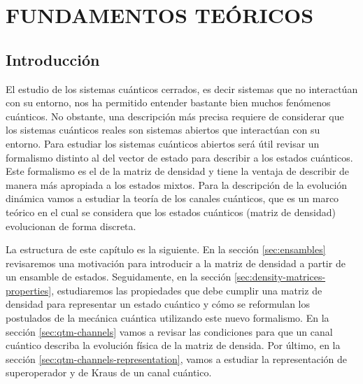 \chapter{FUNDAMENTOS TEÓRICOS}
\section{Introducción} %

El estudio de los sistemas cuánticos cerrados, es decir sistemas que no
interactúan con su entorno, nos ha permitido entender bastante bien muchos
fenómenos cuánticos. No obstante, una descripción más precisa 
requiere de considerar que los sistemas cuánticos reales son sistemas abiertos
que interactúan con su entorno. Para estudiar los 
sistemas cuánticos abiertos será útil revisar un formalismo distinto
al del vector de estado para describir a los estados cuánticos. 
Este formalismo es el de la matriz de densidad y tiene la ventaja 
de describir de manera más apropiada a los estados mixtos. 
Para la descripción de la evolución dinámica  
vamos a estudiar la teoría de los canales cuánticos, 
que es un marco teórico en el cual se considera que los estados 
cuánticos (matriz de densidad) evolucionan de forma discreta.

La estructura de este capítulo es la siguiente.
En la sección \ref{sec:ensambles} revisaremos una motivación para introducir 
a la matriz de densidad a partir de un ensamble de estados. 
Seguidamente, en la sección \ref{sec:density-matrices-properties},
estudiaremos las propiedades que debe cumplir una matriz 
de densidad para representar un estado cuántico
y cómo se reformulan los postulados 
de la mecánica cuántica utilizando este nuevo formalismo.
En la sección \ref{sec:qtm-channels} vamos a revisar las
condiciones para que un canal cuántico describa la evolución 
física de la matriz de densida. Por último, en la sección
\ref{sec:qtm-channels-representation}, vamos a estudiar 
la representación de superoperador y de Kraus de un canal cuántico.


